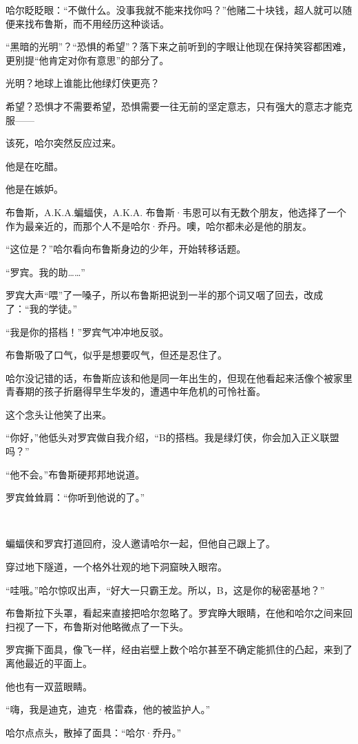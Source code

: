 \documentclass[../main]{subfiles}
\begin{document}
哈尔眨眨眼：“不做什么。没事我就不能来找你吗？”他赌二十块钱，超人就可以随便来找布鲁斯，而不用经历这种谈话。

“黑暗的光明”？“恐惧的希望”？落下来之前听到的字眼让他现在保持笑容都困难，更别提“他肯定对你有意思”的部分了。

光明？地球上谁能比他绿灯侠更亮？

希望？恐惧才不需要希望，恐惧需要一往无前的坚定意志，只有强大的意志才能克服——

该死，哈尔突然反应过来。

他是在吃醋。

他是在嫉妒。

布鲁斯，A.K.A.蝙蝠侠，A.K.A.
布鲁斯·韦恩可以有无数个朋友，他选择了一个作为最亲近的，而那个人不是哈尔·乔丹。噢，哈尔都未必是他的朋友。

“这位是？”哈尔看向布鲁斯身边的少年，开始转移话题。

“罗宾。我的助……”

罗宾大声“喂”了一嗓子，所以布鲁斯把说到一半的那个词又咽了回去，改成了：“我的学徒。”

“我是你的搭档！”罗宾气冲冲地反驳。

布鲁斯吸了口气，似乎是想要叹气，但还是忍住了。

哈尔没记错的话，布鲁斯应该和他是同一年出生的，但现在他看起来活像个被家里青春期的孩子折磨得早生华发的，遭遇中年危机的可怜社畜。

这个念头让他笑了出来。

“你好，”他低头对罗宾做自我介绍，“B的搭档。我是绿灯侠，你会加入正义联盟吗？”

“他不会。”布鲁斯硬邦邦地说道。

罗宾耸耸肩：“你听到他说的了。”

~\

蝙蝠侠和罗宾打道回府，没人邀请哈尔一起，但他自己跟上了。

穿过地下隧道，一个格外壮观的地下洞窟映入眼帘。

“哇哦。”哈尔惊叹出声，“好大一只霸王龙。所以，B，这是你的秘密基地？”

布鲁斯拉下头罩，看起来直接把哈尔忽略了。罗宾睁大眼睛，在他和哈尔之间来回扫视了一下，布鲁斯对他略微点了一下头。

罗宾撕下面具，像飞一样，经由岩壁上数个哈尔甚至不确定能抓住的凸起，来到了离他最近的平面上。

他也有一双蓝眼睛。

“嗨，我是迪克，迪克·格雷森，他的被监护人。”

哈尔点点头，散掉了面具：“哈尔·乔丹。”
\end{document}
